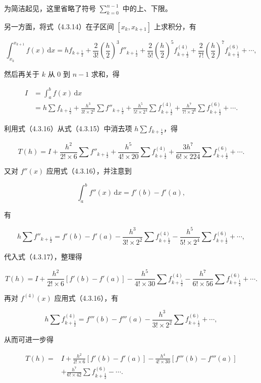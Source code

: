 \documentclass[
  10pt,
  fontset=fandol]{ctexart}
\begin{document}
为简洁起见，这里省略了符号 \(\displaystyle\sum_{k=0}^{n-1}\) 中的上、下限。

另一方面，将式（4.3.14）在子区间 \([x_k,x_{k+1}]\) 上求积分，有

\[
\int_{x_k}^{x_{k+1}}f(x)\,\mathrm{d}x
=hf_{k+\frac12}
+\frac{2}{3!}\left(\frac h2\right)^3f''_{k+\frac12}
+\frac{2}{5!}\left(\frac h2\right)^5f^{(4)}_{k+\frac12}
+\frac{2}{7!}\left(\frac h2\right)^7f^{(6)}_{k+\frac12}+\cdots,
\]

然后再关于 \(k\) 从 \(0\) 到 \(n-1\) 求和，得

\[
\begin{aligned}
I&=\int_a^b f(x)\,\mathrm{d}x\\
&=h\sum f_{k+\frac12}
+\frac{h^3}{3!\times2^2}\sum f''_{k+\frac12}
+\frac{h^5}{5!\times2^4}\sum f^{(4)}_{k+\frac12}
+\frac{h^7}{7!\times2^6}\sum f^{(6)}_{k+\frac12}+\cdots.
\end{aligned}
\tag{4.3.16}
\]

利用式（4.3.16）从式（4.3.15）中消去项 \(h\sum f_{k+\frac12}\)，得

\[
T(h)=I+\frac{h^2}{2!\times6}\sum f''_{k+\frac12}
+\frac{h^5}{4!\times20}\sum f^{(4)}_{k+\frac12}
+\frac{3h^7}{6!\times224}\sum f^{(6)}_{k+\frac12}+\cdots.
\tag{4.3.17}
\]

又对 \(f''(x)\) 应用式（4.3.16），并注意到

\[
\int_a^b f''(x)\,\mathrm{d}x=f'(b)-f'(a),
\]

有

\[
h\sum f''_{k+\frac12}=f'(b)-f'(a)
-\frac{h^3}{3!\times2^2}\sum f^{(4)}_{k+\frac12}
-\frac{h^5}{5!\times2^4}\sum f^{(6)}_{k+\frac12}+\cdots,
\]

代入式（4.3.17），整理得

\[
T(h)=I+\frac{h^2}{2!\times6}[f'(b)-f'(a)]
-\frac{h^5}{4!\times30}\sum f^{(4)}_{k+\frac12}
-\frac{h^7}{6!\times56}\sum f^{(6)}_{k+\frac12}+\cdots.
\]

再对 \(f^{(4)}(x)\) 应用式（4.3.16），有

\[
h\sum f^{(4)}_{k+\frac12}=f'''(b)-f'''(a)
-\frac{h^3}{3!\times2^2}\sum f^{(6)}_{k+\frac12}+\cdots,
\]

从而可进一步得

\[
\begin{aligned}
T(h)={}&I+\frac{h^2}{2!\times6}[f'(b)-f'(a)]
-\frac{h^4}{4!\times30}[f'''(b)-f'''(a)]\\
&+\frac{h^7}{6!\times42}\sum f^{(6)}_{k+\frac12}-\cdots.
\end{aligned}
\tag{4.3.18}
\]
\end{document}
